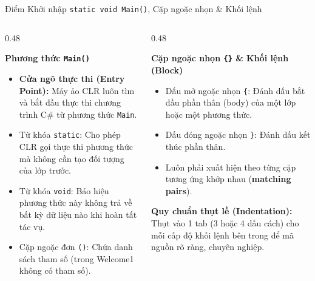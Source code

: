 \documentclass[aspectratio=169, 10pt]{beamer}
\begin{document}
\begin{frame}{Điểm Khởi nhập \texttt{static void Main()}, Cặp ngoặc nhọn \& Khối lệnh}
  \begin{columns}[T]
    \begin{column}{0.48\textwidth}
      \begin{block}{\textbf{Phương thức \texttt{Main()}}}
        \begin{itemize}\small
          \item \textbf{Cửa ngõ thực thi (Entry Point):} Máy ảo CLR luôn tìm và bắt đầu thực thi chương trình C\# từ phương thức \texttt{Main}.
          \item Từ khóa \texttt{static}: Cho phép CLR gọi thực thi phương thức mà không cần tạo đối tượng của lớp trước.
          \item Từ khóa \texttt{void}: Báo hiệu phương thức này không trả về bất kỳ dữ liệu nào khi hoàn tất tác vụ.
          \item Cặp ngoặc đơn \texttt{()}: Chứa danh sách tham số (trong Welcome1 không có tham số).
        \end{itemize}
      \end{block}
    \end{column}

    \begin{column}{0.48\textwidth}
      \begin{block}{\textbf{Cặp ngoặc nhọn \texttt{\{\}} \& Khối lệnh (Block)}}
        \begin{itemize}\small
          \item Dấu mở ngoặc nhọn \texttt{\{}: Đánh dấu bắt đầu phần thân (body) của một lớp hoặc một phương thức.
          \item Dấu đóng ngoặc nhọn \texttt{\}}: Đánh dấu kết thúc phần thân.
          \item Luôn phải xuất hiện theo từng cặp tương ứng khớp nhau (\textbf{matching pairs}).
        \end{itemize}
      \end{block}

      \begin{exampleblock}{\textbf{Quy chuẩn thụt lề (Indentation):}}
        Thụt vào 1 tab (3 hoặc 4 dấu cách) cho mỗi cấp độ khối lệnh bên trong để mã nguồn rõ ràng, chuyên nghiệp.
      \end{exampleblock}
    \end{column}
  \end{columns}
\end{frame}
\end{document}
